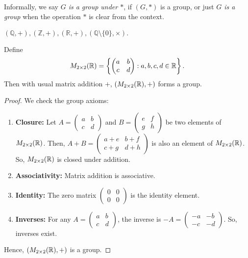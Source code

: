 Informally, we say \textit{$G$ is a group under $*$}, if $(G, *)$ is a group, or just \textit{$G$ is a group} when the operation $*$ is clear from the context.
\begin{eg}
    $(\mathbb{Q}, +), (\mathbb{Z}, +), (\mathbb{R}, +), (\mathbb{Q}\setminus\{0\}, \times)$.
\end{eg}
\begin{eg}
    Define
    \[
        M_{2\times 2}(\mathbb{R}) = \left\{\begin{pmatrix}a & b\\c & d\end{pmatrix}: a,b,c,d\in\mathbb{R}\right\}.
    \]
    Then with usual matrix addition $+$, $(M_{2\times 2}(\mathbb{R}), +)$ forms a group.
\end{eg}
\begin{proof}
    We check the group axioms:
    \begin{enumerate}
        \item \textbf{Closure:} Let $A = \begin{pmatrix}a & b\\c & d\end{pmatrix}$ and $B = \begin{pmatrix}e & f\\g & h\end{pmatrix}$ be two elements of $M_{2\times 2}(\mathbb{R})$. Then, $A + B = \begin{pmatrix}a+e & b+f\\c+g & d+h\end{pmatrix}$ is also an element of $M_{2\times 2}(\mathbb{R})$. So, $M_{2\times 2}(\mathbb{R})$ is closed under addition.
        \item \textbf{Associativity:} Matrix addition is associative.
        \item \textbf{Identity:} The zero matrix $\begin{pmatrix}0 & 0\\0 & 0\end{pmatrix}$ is the identity element.
        \item \textbf{Inverses:} For any $A = \begin{pmatrix}a & b\\c & d\end{pmatrix}$, the inverse is $-A = \begin{pmatrix}-a & -b\\-c & -d\end{pmatrix}$. So, inverses exist.
    \end{enumerate}
    Hence, $(M_{2\times 2}(\mathbb{R}), +)$ is a group.
\end{proof}

